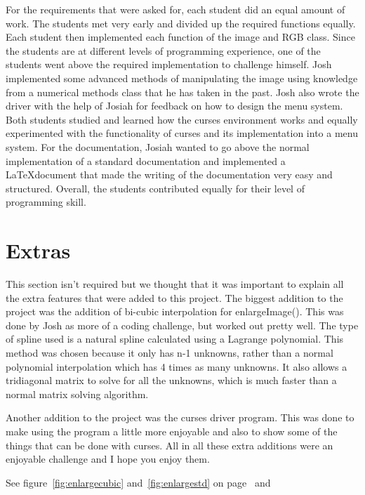 \documentclass[pdftex, 11pt]{article}
\begin{document}
\begin{description}
	For the requirements that were asked for, each student did an equal amount of work. The students met very early and
divided up the required functions equally. Each student then implemented each function of the image and RGB class. Since
the students are at different levels of programming experience, one of the students went above the required
implementation to challenge himself. Josh implemented some advanced methods of manipulating the image using knowledge
from a numerical methods class that he has taken in the past. Josh also wrote the driver with the help of Josiah for
feedback on how to design the menu system. Both students studied and learned how the curses environment works and
equally experimented with the functionality of curses and its implementation into a menu system. For the documentation,
Josiah wanted to go above the normal implementation of a standard documentation and implemented a \LaTeX document that
made the writing of the documentation very easy and structured. Overall, the students contributed equally for their
level of programming skill.

\section{Extras}

				This section isn't required but we thought that it was important to explain all the
				extra features that were added to this project.  The biggest addition to the project was
				the addition of bi-cubic interpolation for enlargeImage().  This was done by Josh as
				more of a coding challenge, but worked out pretty well.  The type of spline used is a
				natural spline calculated using a Lagrange polynomial.  This method was chosen because
				it only has n-1 unknowns, rather than a normal polynomial interpolation which has 4
				times as many unknowns.  It also allows a tridiagonal matrix to solve for all the
				unknowns, which is much faster than a normal matrix solving algorithm.

				Another addition to the project was the curses driver program.  This was done to make
				using the program a little more enjoyable and also to show some of the things that can
				be done with curses.  All in all these extra additions were an enjoyable challenge and I
				hope you enjoy them.

				See figure~\ref{fig:enlargecubic} and~\ref{fig:enlargestd} on
				page~\pageref{fig:enlargecubic} and~\pageref{fig:enlargestd}
				

\end{description}
\end{document}
